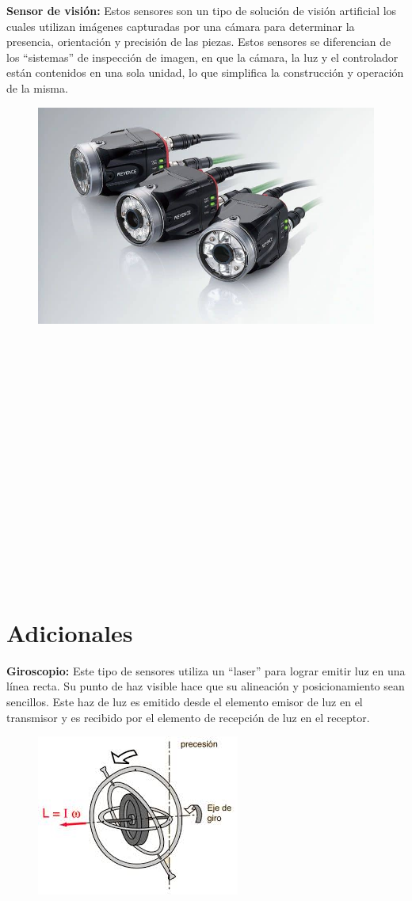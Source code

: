 \textbf{Sensor de visión: }
Estos sensores son un tipo de solución de visión artificial los cuales utilizan imágenes capturadas por una cámara para determinar la presencia, orientación y  precisión de las piezas. Estos sensores se diferencian de los “sistemas” de inspección de imagen, en que la cámara, la luz y el controlador están contenidos en una sola unidad, lo que simplifica la construcción y operación de la misma.

\begin{figure}[h]
	\centering
	\includegraphics[width=0.4\linewidth, height=0.2\textwidth]{img/vision}
	\caption{}
	\label{fig:vision}
\end{figure} 

\textbf{}\\\\\\\\\\\\\\\\\\\\\\\\\\\\\\\

\section{Adicionales}
\textbf{Giroscopio:}
Este tipo de sensores utiliza un “laser” para lograr emitir luz en una línea recta. Su punto de haz visible hace que su alineación y posicionamiento sean sencillos. Este haz de luz es emitido desde el elemento emisor de luz en el transmisor y es recibido por el elemento de recepción de luz en el receptor. 
\vspace{10mm}  %

\begin{figure}[h]
	\centering
	\includegraphics[width=0.3\linewidth, height=0.23\textheight]{img/giros}
	\caption{}
	\label{fig:giros}
\end{figure}


